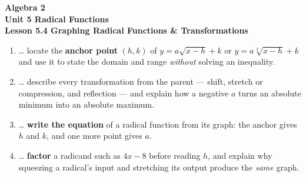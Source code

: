 \documentclass[10pt]{article}
\begin{document}
\vspace{-0.8in}

\begin{center}
  {\color{white}\textbf{\LARGE Algebra 2}}\\[4pt]
  {\color{forestmid}\large\textbf{Unit 5 \quad Radical Functions}}\\[6pt]
  {\color{white}\textbf{\large Lesson 5.4 \quad Graphing Radical Functions \& Transformations}}
\end{center}

\vspace{0.22in}
\namedateperiod
\vspace{0.18in}

\begin{learningtargetbox}
\small
\begin{enumerate}[leftmargin=1.5em, itemsep=5pt]
  \item \ldots{} locate the \textbf{anchor point} $(h,k)$ of $y=a\sqrt{x-h}+k$ or $y=a\sqrt[3]{x-h}+k$ and use it to state the domain and range \emph{without} solving an inequality.
  \item \ldots{} describe every transformation from the parent --- shift, stretch or compression, and reflection --- and explain how a negative $a$ turns an absolute minimum into an absolute maximum.
  \item \ldots{} \textbf{write the equation} of a radical function from its graph: the anchor gives $h$ and $k$, and one more point gives $a$.
  \item \ldots{} \textbf{factor} a radicand such as $4x-8$ before reading $h$, and explain why squeezing a radical's input and stretching its output produce the \emph{same} graph.
\end{enumerate}
\end{learningtargetbox}

\vspace{0.14in}
\end{document}
